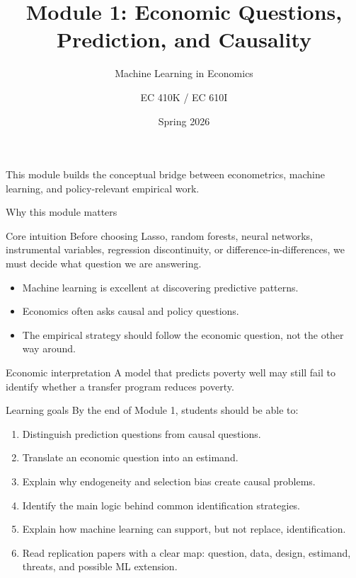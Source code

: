 \documentclass[aspectratio=169,11pt]{beamer}
\title[ML in Economics]{Module 1: Economic Questions, Prediction, and Causality}
\subtitle{Machine Learning in Economics}
\author{EC 410K / EC 610I}
\institute{Wilfrid Laurier University}
\date{Spring 2026}
\newcommand{\core}[1]{\begin{block}{Core intuition}#1\end{block}}
\newcommand{\econ}[1]{\begin{exampleblock}{Economic interpretation}#1\end{exampleblock}}
\begin{document}
\begin{frame}
  \titlepage
  \vspace{-0.5em}
  \begin{center}
  \small
  This module builds the conceptual bridge between econometrics, machine learning, and policy-relevant empirical work.
  \end{center}
\end{frame}

\begin{frame}{Why this module matters}
\core{
Before choosing Lasso, random forests, neural networks, instrumental variables, regression discontinuity, or difference-in-differences, we must decide what question we are answering.
}
\begin{itemize}
  \item Machine learning is excellent at discovering predictive patterns.
  \item Economics often asks causal and policy questions.
  \item The empirical strategy should follow the economic question, not the other way around.
\end{itemize}
\econ{
A model that predicts poverty well may still fail to identify whether a transfer program reduces poverty.
}
\end{frame}

\begin{frame}{Learning goals}
By the end of Module 1, students should be able to:
\begin{enumerate}
  \item Distinguish prediction questions from causal questions.
  \item Translate an economic question into an estimand.
  \item Explain why endogeneity and selection bias create causal problems.
  \item Identify the main logic behind common identification strategies.
  \item Explain how machine learning can support, but not replace, identification.
  \item Read replication papers with a clear map: question, data, design, estimand, threats, and possible ML extension.
\end{enumerate}
\end{frame}
\end{document}
